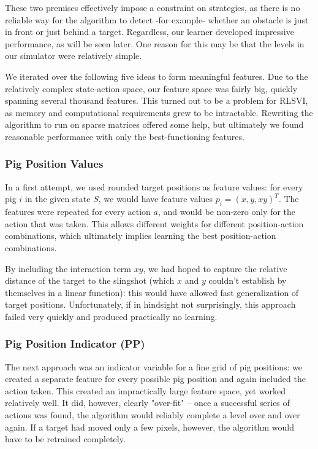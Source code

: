 \documentclass[fleqn,10pt]{SelfArx} %
\begin{document}
These two premises effectively impose a constraint on strategies, as there is no reliable way for the algorithm to detect -for example- whether an obstacle is just in front or just behind a target. Regardless, our learner developed impressive performance, as will be seen later. One reason for this may be that the levels in our simulator were relatively simple.

We iterated over the following five ideas to form meaningful features. Due to the relatively complex state-action space, our feature space was fairly big, quickly spanning several thousand features. This turned out to be a problem for RLSVI, as memory and computational requirements grew to be intractable. Rewriting the algorithm to run on sparse matrices offered some help, but ultimately we found reasonable performance with only the best-functioning features.

\subsubsection{Pig Position Values}
In a first attempt, we used rounded target positions as feature values: for every pig $i$ in the given state $S$, we would have feature values $p_i=(x, y, xy)^T$. The features were repeated for every action $a$, and would be non-zero only for the action that was taken. This allows different weights for different position-action combinations, which ultimately implies learning the best position-action combinations.

By including the interaction term $xy$, we had hoped to capture the relative distance of the target to the slingshot (which $x$ and $y$ couldn't establish by themselves in a linear function): this would have allowed fast generalization of target positions. Unfortunately, if in hindsight not surprisingly, this approach failed very quickly and produced practically no learning.

\subsubsection{Pig Position Indicator (PP)}

The next approach was an indicator variable for a fine grid of pig positions: we created a separate feature for every possible pig position and again included the action taken. This created an impractically large feature space, yet worked relatively well. It did, however, clearly "over-fit" -- once a successful series of actions was found, the algorithm would reliably complete a level over and over again. If a target had moved only a few pixels, however, the algorithm would have to be retrained completely.
\end{document}
